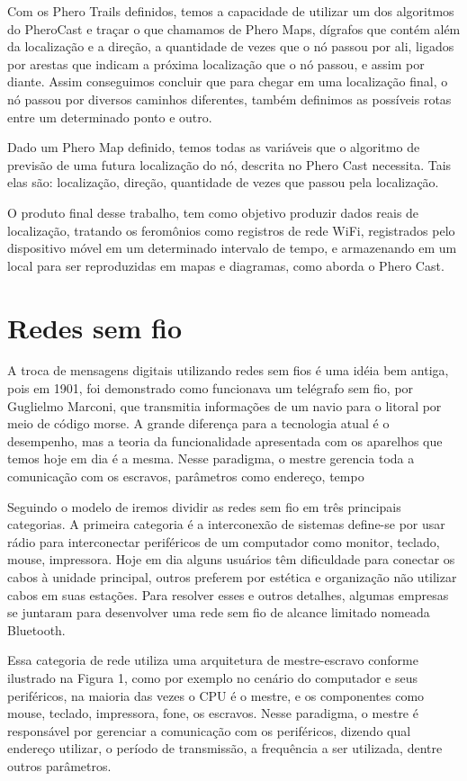 \documentclass[12pt, %
openright, 
oneside,
a4paper,
brazil]{facom-ufu-abntex2}
\begin{document}
	Com os Phero Trails definidos, temos a capacidade de utilizar um dos algoritmos do PheroCast e traçar o que chamamos de Phero Maps, dígrafos que contém além da localização e a direção, a quantidade de vezes que o nó passou por ali, ligados por arestas que indicam a próxima localização que o nó passou, e assim por diante. Assim conseguimos concluir que para chegar em uma localização final, o nó passou por diversos caminhos diferentes, também definimos as possíveis rotas entre um determinado ponto e outro.
	
	Dado um Phero Map definido, temos todas as variáveis que o algoritmo de previsão de uma futura localização do nó, descrita no Phero Cast necessita. Tais elas são: localização, direção, quantidade de vezes que passou pela localização. 
	
 	O produto final desse trabalho, tem como objetivo produzir dados reais de localização, tratando os feromônios como registros de rede \ac{WiFi}, registrados pelo dispositivo móvel em um determinado intervalo de tempo, e armazenando em um local para ser reproduzidas em mapas e diagramas, como aborda o Phero Cast.

\section{Redes sem fio}
A troca de mensagens digitais utilizando redes sem fios é uma idéia bem antiga, pois em 1901, foi demonstrado como funcionava um telégrafo sem fio, por Guglielmo Marconi, que transmitia informações de um navio para o litoral por meio de código morse. A grande diferença para a tecnologia atual é o desempenho, mas a teoria da funcionalidade apresentada com os aparelhos que temos hoje em dia é a mesma. Nesse paradigma, o mestre gerencia toda a comunicação com os escravos, parâmetros como endereço, tempo 

Seguindo o modelo de \cite{tanenbaum2003redes} iremos dividir as redes sem fio em três principais categorias. A primeira categoria é a interconexão de sistemas define-se por usar rádio para interconectar periféricos de um computador como monitor, teclado, mouse, impressora. Hoje em dia alguns usuários têm dificuldade para conectar os cabos à unidade principal, outros preferem por estética e organização não utilizar cabos em suas estações. Para resolver esses e outros detalhes, algumas empresas se juntaram para desenvolver uma rede sem fio de alcance limitado nomeada Bluetooth.

Essa categoria de rede utiliza uma arquitetura de mestre-escravo conforme ilustrado na Figura 1, como por exemplo no cenário do computador e seus periféricos, na maioria das vezes o CPU é o mestre, e os componentes como mouse, teclado, impressora, fone, os escravos. Nesse paradigma, o mestre é responsável por gerenciar a comunicação com os periféricos, dizendo qual endereço utilizar, o período de transmissão, a frequência a ser utilizada, dentre outros parâmetros.
\end{document}
